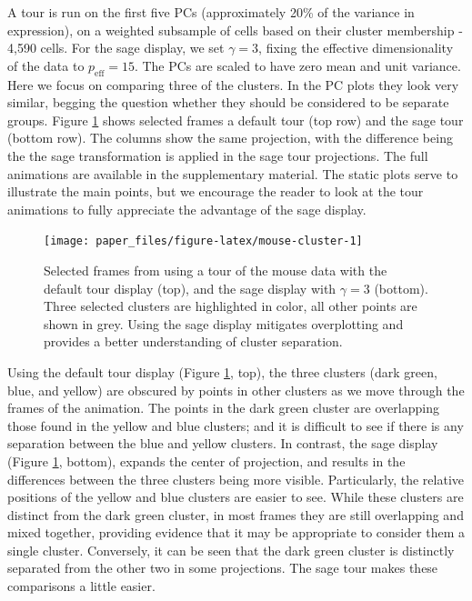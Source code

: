 \documentclass[]{interact}
\theoremstyle{plain}%
\theoremstyle{definition}
\theoremstyle{remark}
\begin{document}
A tour is run on the first five PCs (approximately 20\% of the variance
in expression), on a weighted subsample of cells based on their cluster
membership - 4,590 cells. For the sage display, we set \(\gamma = 3\),
fixing the effective dimensionality of the data to
\(p_{\mathrm{eff}} = 15\). The PCs are scaled to have zero mean and unit
variance. Here we focus on comparing three of the clusters. In the PC
plots they look very similar, begging the question whether they should
be considered to be separate groups. Figure \ref{fig:mouse-cluster}
shows selected frames a default tour (top row) and the sage tour (bottom
row). The columns show the same projection, with the difference being
the the sage transformation is applied in the sage tour projections. The
full animations are available in the supplementary material. The static
plots serve to illustrate the main points, but we encourage the reader
to look at the tour animations to fully appreciate the advantage of the
sage display.

\begin{figure}

{\centering \texttt{[image: paper\_files/figure-latex/mouse-cluster-1]} 

}

\caption{Selected frames from using a tour of the mouse data with the default tour display (top), and the sage display with $\gamma=3$ (bottom). Three selected clusters are highlighted in color, all other points are shown in grey. Using the sage display mitigates overplotting and provides a better understanding of cluster separation.}\label{fig:mouse-cluster}
\end{figure}

Using the default tour display (Figure \ref{fig:mouse-cluster}, top),
the three clusters (dark green, blue, and yellow) are obscured by points
in other clusters as we move through the frames of the animation. The
points in the dark green cluster are overlapping those found in the
yellow and blue clusters; and it is difficult to see if there is any
separation between the blue and yellow clusters. In contrast, the sage
display (Figure \ref{fig:mouse-cluster}, bottom), expands the center of
projection, and results in the differences between the three clusters
being more visible. Particularly, the relative positions of the yellow
and blue clusters are easier to see. While these clusters are distinct
from the dark green cluster, in most frames they are still overlapping
and mixed together, providing evidence that it may be appropriate to
consider them a single cluster. Conversely, it can be seen that the dark
green cluster is distinctly separated from the other two in some
projections. The sage tour makes these comparisons a little easier.
\end{document}
